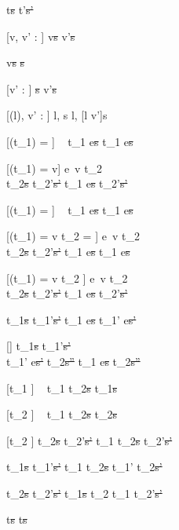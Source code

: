 
  {t\st{s} \handle{\eta} t'\st{s'}}

[v, v' : \tau]
  { }
  {\Edit v\st{s}  \Edit v'\st{s}}

  { }
  {\Edit v\st{s} \handle{\Empty} \Fill\st{s}}

[v' : \tau]
  { }
  {\Fill \tau\st{s}  \Edit v'\st{s}}

[\Sigma(l), v' : \tau]
  { }
  {\Watch l, s  \Watch l, [l \mapsto v']s}

[\Observe(t_1) = \nothing]
  {\ }
  {t_1 \Next e\st{s} \handle{\Continue} t_1 \Next e\st{s}}

[\Observe(t_1) = v]
  {e\ v \evaluate t_2    \\
   t_2\st{s} \normalise t_2'\st{s'} }
  {t_1 \Next e\st{s} \handle{\Continue} t_2'\st{s'}}

[\Observe(t_1) = \nothing]
  {\ }
  {t_1 \Then e\st{s} \handle{\Execute \pi} t_1 \Then e\st{s}}

[\Observe(t_1) = v \land t_2 = \Fail]
  {e\ v \evaluate t_2    \\
   t_2\st{s} \handle{\Pick \pi} t_2'\st{s'} }
  {t_1 \Then e\st{s} \handle{\Execute \pi} t_1 \Then e\st{s}}

[\Observe(t_1) = v \land t_2 \neq \Fail]
  {e\ v \evaluate t_2    \\
   t_2\st{s} \handle{\Pick \pi} t_2'\st{s'} }
  {t_1 \Then e\st{s} \handle{\Execute \pi} t_2'\st{s'}}

  {t_1\st{s} \handle{\eta} t_1'\st{s'}}
  {t_1 \Next e\st{s} \handle{\eta} t_1' \Next e\st{s'}}

[\eta \neq \Execute \pi]
  {t_1\st{s} \handle{\eta} t_1'\st{s'}       \\
   t_1' \Then e\st{s'} \normalise t_2\st{s''} }
  {t_1 \Then e\st{s} \handle{\eta} t_2\st{s''}}

[t_1 \neq \Fail]
  {\ }
  {t_1 \Or t_2\st{s} \handle{\Pick \First} t_1\st{s}}

[t_2 \neq \Fail]
  {\ }
  {t_1 \Or t_2\st{s} \handle{\Pick \Second} t_2\st{s}}

[t_2 \neq \Fail]
  {t_2\st{s} \handle{\Pick \pi} t_2'\st{s'}}
  {t_1 \Or t_2\st{s} \handle{\Pick \Other \pi} t_2'\st{s'}}


  {t_1\st{s} \handle{\eta} t_1'\st{s'} }
  {t_1 \AndOr t_2\st{s} \handle{\Left \eta} t_1' \AndOr t_2\st{s'}}

  {t_2\st{s} \handle{\eta} t_2'\st{s'} }
  {t_1\st{s} \AndOr t_2 \handle{\Right \eta} t_1 \AndOr t_2'\st{s'}}

  { }
  {t\st{s} \handle{\eta} t\st{s}}
